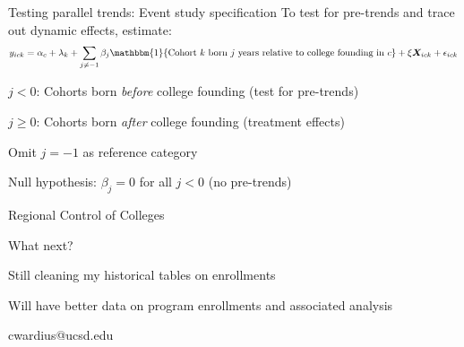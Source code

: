 \documentclass[notes,11pt, aspectratio=169]{beamer}
\newenvironment{wideitemize}{\itemize\addtolength{\itemsep}{10pt}}{\enditemize}
\begin{document}
\begin{frame}{Testing parallel trends: Event study specification}
  To test for pre-trends and trace out dynamic effects, estimate:
  \begin{equation}
    y_{ick} = \alpha_c + \lambda_k + \sum_{j \neq -1} \beta_j \mathbbm{1}\{\text{Cohort } k \text{ born } j \text{ years relative to college founding in } c\} + \xi \bm{X}_{ick} + \epsilon_{ick}
  \end{equation}
  \begin{wideitemize}
    \item $j < 0$: Cohorts born \textit{before} college founding (test for pre-trends)
    \item $j \geq 0$: Cohorts born \textit{after} college founding (treatment effects)
    \item Omit $j = -1$ as reference category
    \item Null hypothesis: $\beta_j = 0$ for all $j < 0$ (no pre-trends)
  \end{wideitemize}
\end{frame}

\begin{frame}{Regional Control of Colleges}
    
\end{frame}


\begin{frame}{What next?}
  \begin{wideitemize}
    \item Still cleaning my historical tables on enrollments
    \item Will have better data on program enrollments and associated analysis 
  \end{wideitemize}
\end{frame}

\begin{frame}{}
\centering cwardius@ucsd.edu
\end{frame}
\end{document}
